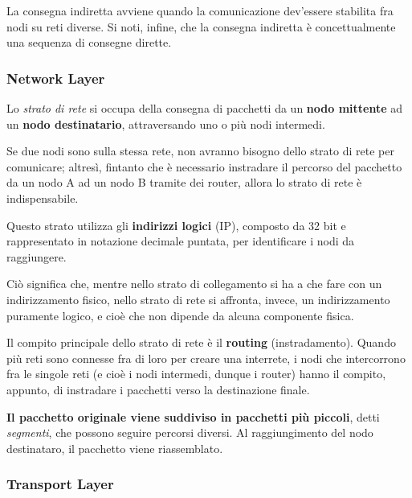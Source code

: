             La consegna indiretta avviene quando la comunicazione dev'essere stabilita fra nodi su reti diverse. Si noti, infine, che la consegna indiretta è concettualmente una sequenza di consegne dirette.
        
        \subsubsection{Network Layer}
        
            Lo \textit{strato di rete} si occupa della consegna di pacchetti da un \textbf{nodo mittente} ad un \textbf{nodo destinatario}, attraversando uno o più nodi intermedi. 
            
            Se due nodi sono sulla stessa rete, non avranno bisogno dello strato di rete per comunicare; altresì, fintanto che è necessario instradare il percorso del pacchetto da un nodo A ad un nodo B tramite dei router, allora lo strato di rete è indispensabile.
            
            \vspace{3mm}
            
            Questo strato utilizza gli \textbf{indirizzi logici} (IP), composto da 32 bit e rappresentato in notazione decimale puntata, per identificare i nodi da raggiungere. 
            
            Ciò significa che, mentre nello strato di collegamento si ha a che fare con un indirizzamento fisico, nello strato di rete si affronta, invece, un indirizzamento puramente logico, e cioè che non dipende da alcuna componente fisica.
            
            \vspace{3mm}
            
            Il compito principale dello strato di rete è il \textbf{routing} (instradamento). Quando più reti sono connesse fra di loro per creare una interrete, i nodi che intercorrono fra le singole reti (e cioè i nodi intermedi, dunque i router) hanno il compito, appunto, di instradare i pacchetti verso la destinazione finale. 
            
            \textbf{Il pacchetto originale viene suddiviso in pacchetti più piccoli}, detti \textit{segmenti}, che possono seguire percorsi diversi. Al raggiungimento del nodo destinataro, il pacchetto viene riassemblato.
        
        \subsubsection{Transport Layer}
        
